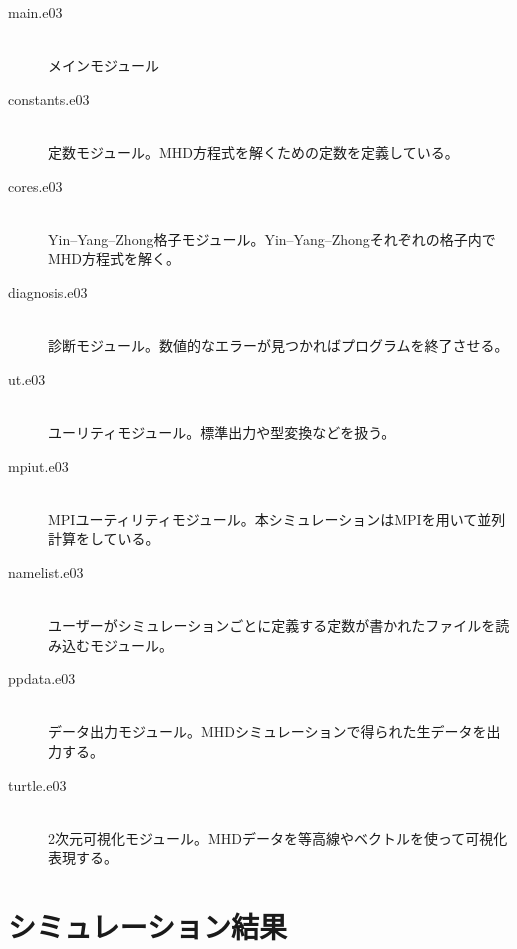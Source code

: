 \documentclass[12pt]{jsarticle}
\begin{document}
\begin{description}
  \item[main.e03]\mbox{}\\
  メインモジュール
  \item[constants.e03]\mbox{}\\
  定数モジュール。MHD方程式を解くための定数を定義している。
  \item[cores.e03]\mbox{}\\
  Yin--Yang--Zhong格子モジュール。Yin--Yang--Zhongそれぞれの格子内でMHD方程式を解く。
  \item [diagnosis.e03]\mbox{}\\
  診断モジュール。数値的なエラーが見つかればプログラムを終了させる。
  \item [ut.e03]\mbox{}\\
  ユーリティモジュール。標準出力や型変換などを扱う。
  \item [mpiut.e03]\mbox{}\\
  MPIユーティリティモジュール。本シミュレーションはMPIを用いて並列計算をしている。
  \item [namelist.e03]\mbox{}\\
  ユーザーがシミュレーションごとに定義する定数が書かれたファイルを読み込むモジュール。
  \item [ppdata.e03]\mbox{}\\
  データ出力モジュール。MHDシミュレーションで得られた生データを出力する。
  \item [turtle.e03]\mbox{}\\
  2次元可視化モジュール。MHDデータを等高線やベクトルを使って可視化表現する。
\end{description}



\section{シミュレーション結果}
\end{document}
